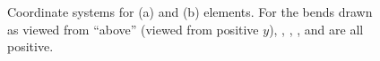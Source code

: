 \begin{figure}[tb]
  \centering
  \hspace{1cm}
  \caption[Coordinate systems for (a) \ and (b) \ elements.]
{Coordinate systems for (a)  and (b)  elements.
For the bends drawn as viewed from ``above'' (viewed from positive $y$),
, , ,  and  are all positive.}
  \label{f:bend}
\end{figure}

